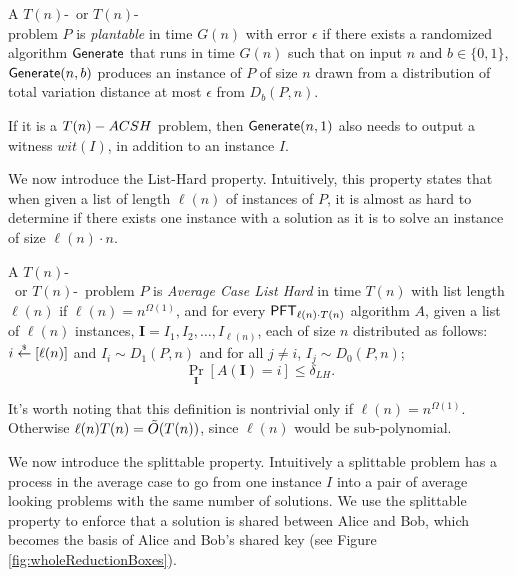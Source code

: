 \begin{definition}
	\label{def:plantable}
	A $T(n)$-\ACIH~or $T(n)$-\ACSH~\\problem $P$ is \emph{plantable} in time $G(n)$ with error $\epsilon$ if there exists a randomized algorithm $\Generate$ that runs in time $G(n)$ such that on input $n$ and $b \in \{0,1\}$, $\Generate(n,b)$ produces an instance of $P$ of size $n$ drawn from a distribution of total variation distance at most $\epsilon$ from $D_{b}(P, n)$.
	
	If it is a $T(n)-\ACSH$ problem, then $\Generate(n, 1)$ also needs to output a witness $wit(I)$, in addition to an instance $I$.
\end{definition}

%
We now introduce the List-Hard property. Intuitively, this property states that when given a list of length $\ell(n)$ of instances of $P$, it is almost as hard to determine if there exists one instance with a solution as it is to solve an instance of size $\ell(n) \cdot n$.



\begin{definition}\label{def:aclh}
	A $T(n)$-\\
	\ACIH~or $T(n)$-\ACSH~problem $P$ is \emph{Average Case List Hard} in time $T(n)$ with list length $\ell(n)$ if $\ell(n) = n^{\Omega(1)}$, and for every $\PFT{\ell(n) \cdot T(n)}$ algorithm $A$, given a list of $\ell(n)$ instances, $\mathbf I = I_1,I_2,\ldots,I_{\ell(n)}$, each of size $n$
	distributed as follows: $i \getsr [\ell(n)]$ and $I_i \sim D_1(P,n)$ and for all $j \neq i$, $I_j \sim D_0(P,n)$;
	\[ \Pr_{\mathbf I}[A(\mathbf I) = i] \le \delta_{LH}. \]
\end{definition}

It's worth noting that this definition is nontrivial only if $\ell(n) = n^{\Omega(1)}$. Otherwise $\ell(n) T(n) = \~O(T(n))$, since $\ell(n)$ would be sub-polynomial.


We now introduce the splittable property. Intuitively a splittable problem has a process in the average case to go from one instance $I$ into a pair of average looking problems with the same number of solutions. We use the splittable property to enforce that a solution is shared between Alice and Bob, which becomes the basis of Alice and Bob's shared key (see Figure \ref{fig:wholeReductionBoxes}). 


